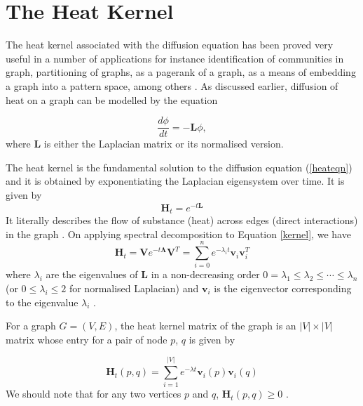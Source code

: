 \documentclass[10pt,a4paper]{article}
\theoremstyle{plain}
\theoremstyle{definition}
\begin{document}
       
        \newpage
        \section{The Heat Kernel}
        The heat kernel associated with the diffusion equation has been proved very useful in a number of applications for instance identification of communities in graph, partitioning of graphs, as a pagerank of a graph, as a means of embedding a graph into a pattern space, among others \citep{chung2007heat,chung2009local,kloster2014heat}. 
        As discussed earlier, diffusion of heat on a graph can be modelled by the equation 
        
        \begin{equation}
        \frac{d \phi}{dt} = -\mathbf{L} \phi,
        \label{heateqn}
        \end{equation}
        where $\mathbf{L}$ is either the Laplacian matrix or its normalised version. 
        
        The heat kernel is the fundamental solution to the diffusion equation (\ref{heateqn}) and it is obtained by exponentiating the Laplacian eigensystem over time. It is given by
        \begin{equation}
        \mathbf{H}_t = e^{-t \mathbf{L}} 
        \label{kernel}
        \end{equation}
        It literally describes the flow of substance (heat) across edges (direct interactions) in the graph \citep{xiao2009graph}.
        On applying spectral decomposition to Equation \ref{kernel}, we have 
        \begin{equation}
        \mathbf{H}_t = \mathbf{V} e^{-t \mathbf{\Lambda}} \mathbf{V}^T =  \sum_{i=0}^n e^{-\lambda_i t} \mathbf{v}_i \mathbf{v}_i^T 
        \label{decomp}
        \end{equation}
        where $\lambda_i$ are the eigenvalues of $\mathbf{L}$ in a non-decreasing order $0=\lambda_1 \leq  \lambda_2 \leq \cdots \leq \lambda_n$ (or $0 \leq \lambda_i \leq 2$ for normalised Laplacian) and $\mathbf{v}_i$ is the eigenvector corresponding to the eigenvalue $\lambda_i$ \citep{anton2007elementary}.
        
        For a graph $G=(V,E)$, the heat kernel matrix of the graph is an $|V| \times |V|$ matrix whose entry for a pair of node $p$, $q$ is given by 
        
        \begin{equation}
        \mathbf{H}_t(p,q) = \sum_{i=1}^{|V|} e^{-\lambda t} \mathbf{v}_i(p) \mathbf{v}_i(q)
        \end{equation} 
        We should note that for any two vertices $p$ and $q$, $\mathbf{H}_t(p,q) \geq 0$ \citep{chung1997spectral}.
        
\end{document}
